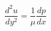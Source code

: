 \documentclass[preview,border=2pt]{standalone}
\begin{document}
\[
\frac{d^{2}u}{dy^{2}} =\frac{1}{\mu}\frac{dp}{dx}
\]
\end{document}
